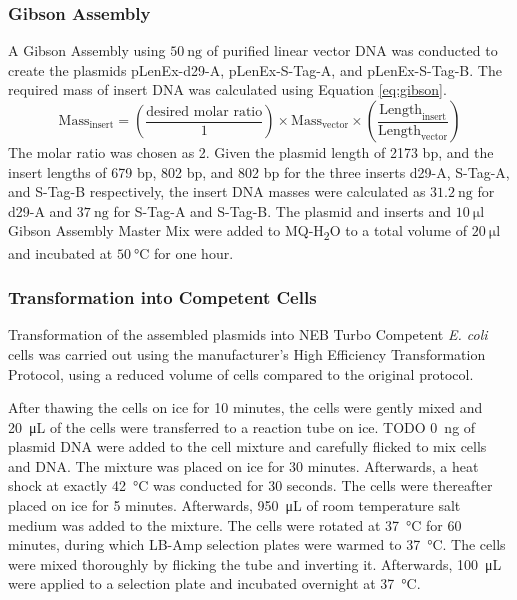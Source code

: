 \subsubsection{Gibson Assembly}
A Gibson Assembly using $\SI{50}{\nano\gram}$ of purified linear vector DNA was conducted to create the plasmids pLenEx-d29-A, pLenEx-S-Tag-A, and pLenEx-S-Tag-B. The required mass of insert DNA was calculated using Equation \ref{eq:gibson}.
\begin{equation}\label{eq:gibson}
\text{Mass}_{\text{insert}} = \left(\frac{\text{desired molar ratio}}{1}\right) \times \text{Mass}_{\text{vector}} \times \left(\frac{\text{Length}_{\text{insert}}}{\text{Length}_{\text{vector}}}\right)
\end{equation}
The molar ratio was chosen as 2. 
Given the plasmid length of 2173 bp, and the insert lengths of 679 bp, 802 bp, and 802 bp for the three inserts d29-A, S-Tag-A, and S-Tag-B respectively, the insert DNA masses were calculated as $\SI{31.2}{\nano\gram}$ for d29-A and $\SI{37}{\nano\gram}$ for S-Tag-A and S-Tag-B. 
The plasmid and inserts and $\SI{10}{\micro\litre}$ Gibson Assembly\textsuperscript{\textregistered} Master Mix were added to MQ-H\textsubscript{2}O to a total volume of $\SI{20}{\micro\litre}$ and incubated at $\SI{50}{\degreeCelsius}$ for one hour. 

\subsubsection{Transformation into Competent Cells}
Transformation of the assembled plasmids into NEB\textsuperscript{\textregistered} Turbo Competent \emph{E. coli} cells was carried out using the manufacturer's High Efficiency Transformation Protocol, using a reduced volume of cells compared to the original protocol.

After thawing the cells on ice for 10 minutes, the cells were gently mixed and \SI{20}{\micro\liter} of the cells were transferred to a reaction tube on ice. TODO \SI{0}{\nano\gram} of plasmid DNA were added to the cell mixture and carefully flicked to mix cells and DNA. The mixture was placed on ice for 30 minutes. Afterwards, a heat shock at exactly \SI{42}{\celsius} was conducted for 30 seconds. The cells were thereafter placed on ice for 5 minutes. Afterwards, \SI{950}{\micro\liter} of room temperature salt medium was added to the mixture. The cells were rotated at \SI{37}{\celsius} for 60 minutes, during which LB-Amp selection plates were warmed to \SI{37}{\celsius}. The cells were mixed thoroughly by flicking the tube and inverting it. Afterwards, \SI{100}{\micro\liter} were applied to a selection plate and incubated overnight at \SI{37}{\celsius}.

